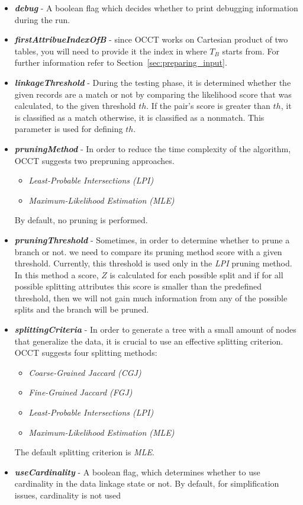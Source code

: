 \documentclass[a4paper,12pt]{article}
\begin{document}
\begin{spacing}{1.5}
\begin{itemize}
  \item \textbf{{\em debug}} - A boolean flag which decides whether to print debugging information during the run.
  \item \textbf{{\em firstAttribueIndexOfB}} - since OCCT works on Cartesian product of two tables, you will need to provide it the index in where $T_{B}$ starts from. For further information refer to Section~\ref{sec:preparing_input}.
  \item \textbf{{\em linkageThreshold}} - During the testing phase, it is determined whether the given records are a match or not by comparing the likelihood score that was calculated, to the given threshold $th$. If the pair's score is greater than $th$, it is classified as a match otherwise, it is classified as a nonmatch. This parameter is used for defining $th$.
  \item \textbf{{\em pruningMethod}} - In order to reduce the time complexity of the algorithm, OCCT suggests two prepruning approaches.
  \begin{itemize}
    \item {\em Least-Probable Intersections (LPI)}
    \item {\em Maximum-Likelihood Estimation (MLE)}
  \end{itemize}
  By default, no pruning is performed.
  \item \textbf{{\em pruningThreshold}} - Sometimes, in order to determine whether to prune a branch or not. we need to compare its pruning method score with a given threshold. Currently, this threshold is used only in the {\em LPI} pruning method. In this method a score, $Z$ is calculated for each possible split and if for all possible splitting attributes this score is smaller than the predefined threshold, then we will not gain much information from any of the possible splits and the branch will be pruned.      
  \item \textbf{{\em splittingCriteria}} - In order to generate a tree with a small amount of nodes that generalize the data,
  it is crucial to use an effective splitting criterion. OCCT suggests four splitting methods:
  \begin{itemize}
    \item {\em Coarse-Grained Jaccard (CGJ)}
    \item {\em Fine-Grained Jaccard (FGJ)}
    \item {\em Least-Probable Intersections (LPI)}
    \item {\em Maximum-Likelihood Estimation (MLE)}
  \end{itemize}
  The default splitting criterion is {\em MLE}.
  \item \textbf{{\em useCardinality}} - A boolean flag, which determines whether to use cardinality in the data linkage state or not. By default, for simplification issues, cardinality is not used
\end{itemize}


\end{spacing}
\end{document}
